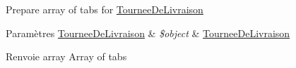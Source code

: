 Prepare array of tabs for \hyperlink{classTourneeDeLivraison}{Tournee\+De\+Livraison}


\begin{DoxyParams}[1]{Paramètres}
\hyperlink{classTourneeDeLivraison}{Tournee\+De\+Livraison} & {\em \$object} & \hyperlink{classTourneeDeLivraison}{Tournee\+De\+Livraison} \\
\hline
\end{DoxyParams}
\begin{DoxyReturn}{Renvoie}
array Array of tabs 
\end{DoxyReturn}
